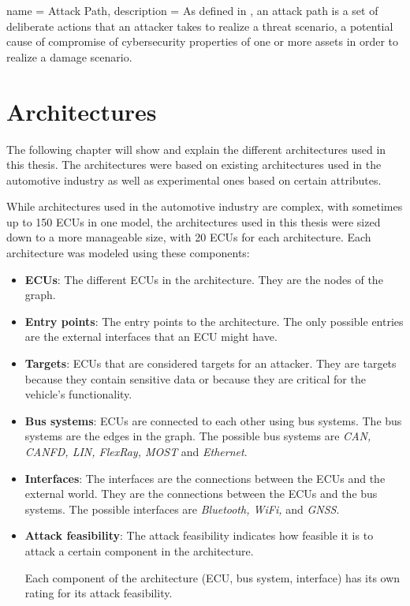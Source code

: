 {
    name = Attack Path,
    description = {
        As defined in \cite{iso21434}, an attack path is a
        set of deliberate actions that an attacker takes to realize a threat scenario, a potential cause of compromise of cybersecurity properties of one or more assets in order to realize a damage scenario.
    }
}


\chapter{Architectures}
\label{chp:arch}

The following chapter will show and explain the different architectures used in this thesis.
The architectures were based on existing architectures used in the automotive industry as well as experimental ones based on certain attributes.

While architectures used in the automotive industry are complex, with sometimes up to 150 ECUs in one model, 
the architectures used in this thesis were sized down to a more manageable size, with 20 ECUs for each architecture.
Each architecture was modeled using these components:

\begin{itemize}

    \item \textbf{ECUs}: The different ECUs in the architecture. They are the nodes of the graph.
    
    \item \textbf{Entry points}: The entry points to the architecture. The only possible entries are the external interfaces that an ECU might have.
    
    \item \textbf{Targets}: ECUs that are considered targets for an attacker. They are targets because they contain sensitive data or because they are critical for the vehicle's functionality.
    
    \item \textbf{Bus systems}: ECUs are connected to each other using bus systems. The bus systems are the edges in the graph. The possible bus systems are \textit{CAN, CANFD, LIN, FlexRay, MOST} and \textit{Ethernet}.
    
    \item \textbf{Interfaces}: The interfaces are the connections between the ECUs and the external world. They are the connections between the ECUs and the bus systems. The possible interfaces are \textit{Bluetooth, WiFi,} and \textit{GNSS}.
    
    \item \textbf{Attack feasibility}: The attack feasibility indicates how feasible it is to attack a certain component in the architecture.
    
    Each component of the architecture (ECU, bus system, interface) has its own rating for its attack feasibility.

\end{itemize}


